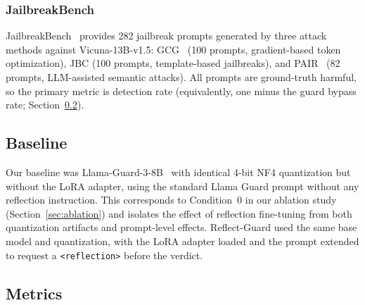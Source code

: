 \documentclass[superintelligence,article,accept,moreauthors]{Definitions/mdpi}
\begin{document}
\subsubsection{JailbreakBench} JailbreakBench~\citep{chao2024jailbreakbench} provides 282 jailbreak prompts generated by three attack methods against Vicuna-13B-v1.5: GCG~\citep{zou2023universal} (100 prompts, gradient-based token optimization), JBC (100 prompts, template-based jailbreaks), and PAIR~\citep{chao2023jailbreaking} (82 prompts, LLM-assisted semantic attacks). All prompts are ground-truth harmful, so the primary metric is detection rate (equivalently, one minus the guard bypass rate; Section~\ref{sec:metrics}).

\subsection{Baseline}

Our baseline was Llama-Guard-3-8B~\citep{metallamaguard3} with identical 4-bit NF4 quantization but without the LoRA adapter, using the standard Llama Guard prompt without any reflection instruction. This corresponds to Condition~0 in our ablation study (Section~\ref{sec:ablation}) and isolates the effect of reflection fine-tuning from both quantization artifacts and prompt-level effects. Reflect-Guard used the same base model and quantization, with the LoRA adapter loaded and the prompt extended to request a \texttt{<reflection>} before the verdict.

\subsection{Metrics}
\label{sec:metrics}
\end{document}
